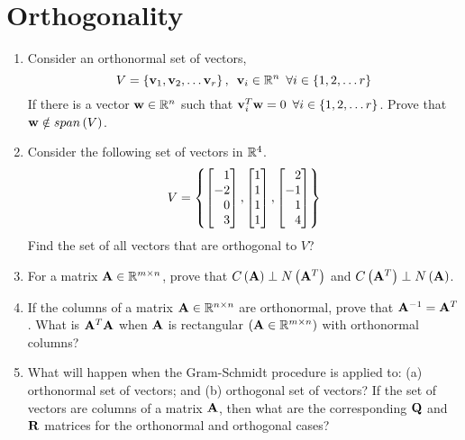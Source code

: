 \chapter{Orthogonality}

\begin{enumerate}[resume]
    \item Consider an orthonormal set of vectors,
    $$V = \left\{ \mathbf{v}_1, \mathbf{v}_2, \ldots \mathbf{v}_r\right\},\,\,\, \mathbf{v}_i \in \mathbb{R}^n\,\,\,\forall i \in \left\{1, 2, \ldots r\right\}$$
    If there is a vector $\mathbf{w} \in \mathbb{R}^n$ such that $\mathbf{v}_i^T\mathbf{w} = 0\,\,\,\forall i \in \left\{1, 2, \ldots r\right\}$. Prove that $\mathbf{w} \notin span\left(V\right)$.
    
    \item Consider the following set of vectors in $\mathbb{R}^4$.
    \[ V = \left\{
    \bmx
    1\\-2\\0\\3
    \emx,
    \bmx
    1\\1\\1\\1
    \emx,
    \bmx
    2\\-1\\1\\4
    \emx
    \right\} \]
    Find the set of all vectors that are orthogonal to $V$?

    \item For a matrix $\mathbf{A} \in \mathbb{R}^{m \times n}$, prove that $C\left(\mathbf{A}\right) \perp N\left(\mathbf{A}^T\right)$ and $C\left(\mathbf{A}^T\right) \perp N\left(\mathbf{A}\right)$.

    \item If the columns of a matrix $\mathbf{A} \in \mathbb{R}^{n \times n}$ are orthonormal, prove that $\mathbf{A}^{-1} = \mathbf{A}^T$. What is $\mathbf{A}^T\mathbf{A}$ when $\mathbf{A}$ is rectangular $\left(\mathbf{A} \in \mathbb{R}^{m \times n}\right)$ with orthonormal columns?

    \item What will happen when the Gram-Schmidt procedure is applied to: (a) orthonormal set of vectors; and (b) orthogonal set of vectors? If the set of vectors are columns of a matrix $\mathbf{A}$, then what are the corresponding $\mathbf{Q}$ and $\mathbf{R}$ matrices for the orthonormal and orthogonal cases?


\end{enumerate}
